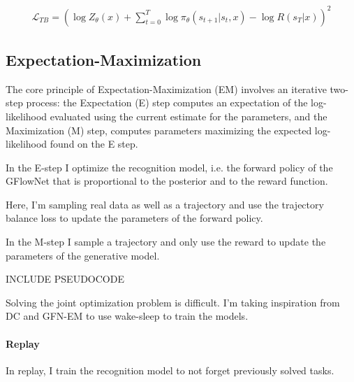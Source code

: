 \begin{align}
     \mathcal{L}_{TB} = \left(\log Z_\theta(x) + \sum_{t=0}^{T} \log \pi_\theta(s_{t+1}|s_{t}, x) - \log R(s_T \vert x)\right)^2
\end{align}     




\subsection{Expectation-Maximization}


The core principle of Expectation-Maximization (EM) involves an iterative two-step process: the Expectation (E) step computes an expectation of the log-likelihood evaluated using the current estimate for the parameters, and the Maximization (M) step, computes parameters maximizing the expected log-likelihood found on the E step.

In the E-step I optimize the recognition model, i.e. the forward policy of the GFlowNet that is proportional to the posterior and to the reward function. 

Here, I'm sampling real data as well as a trajectory and use the trajectory balance loss to update the parameters of the forward policy.

In the M-step I sample a trajectory and only use the reward to update the parameters of the generative model.


INCLUDE PSEUDOCODE



Solving the joint optimization problem is difficult. I'm taking inspiration from DC and GFN-EM to use wake-sleep to train the models.
\paragraph{Replay}
In replay, I train the recognition model to not forget previously solved tasks.
